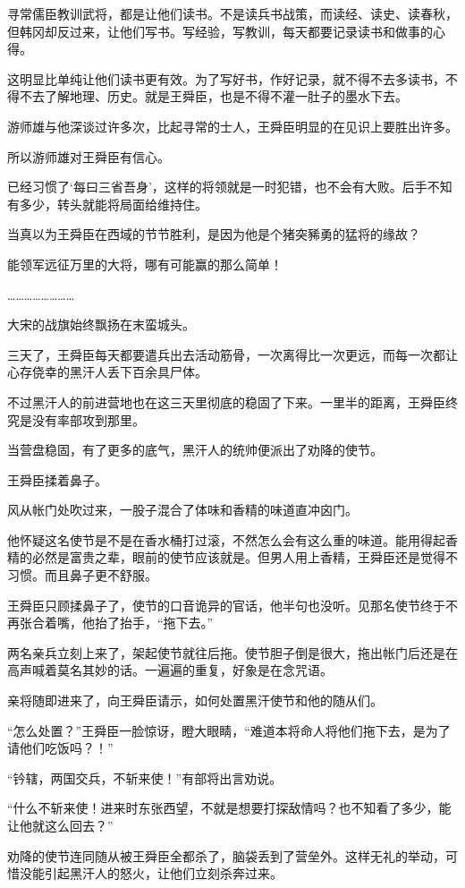 寻常儒臣教训武将，都是让他们读书。不是读兵书战策，而读经、读史、读春秋，但韩冈却反过来，让他们写书。写经验，写教训，每天都要记录读书和做事的心得。

这明显比单纯让他们读书更有效。为了写好书，作好记录，就不得不去多读书，不得不去了解地理、历史。就是王舜臣，也是不得不灌一肚子的墨水下去。

游师雄与他深谈过许多次，比起寻常的士人，王舜臣明显的在见识上要胜出许多。

所以游师雄对王舜臣有信心。

已经习惯了‘每曰三省吾身’，这样的将领就是一时犯错，也不会有大败。后手不知有多少，转头就能将局面给维持住。

当真以为王舜臣在西域的节节胜利，是因为他是个猪突豨勇的猛将的缘故？

能领军远征万里的大将，哪有可能赢的那么简单！

……………………

大宋的战旗始终飘扬在末蛮城头。

三天了，王舜臣每天都要遣兵出去活动筋骨，一次离得比一次更远，而每一次都让心存侥幸的黑汗人丢下百余具尸体。

不过黑汗人的前进营地也在这三天里彻底的稳固了下来。一里半的距离，王舜臣终究是没有率部攻到那里。

当营盘稳固，有了更多的底气，黑汗人的统帅便派出了劝降的使节。

王舜臣揉着鼻子。

风从帐门处吹过来，一股子混合了体味和香精的味道直冲囟门。

他怀疑这名使节是不是在香水桶打过滚，不然怎么会有这么重的味道。能用得起香精的必然是富贵之辈，眼前的使节应该就是。但男人用上香精，王舜臣还是觉得不习惯。而且鼻子更不舒服。

王舜臣只顾揉鼻子了，使节的口音诡异的官话，他半句也没听。见那名使节终于不再张合着嘴，他抬了抬手，“拖下去。”

两名亲兵立刻上来了，架起使节就往后拖。使节胆子倒是很大，拖出帐门后还是在高声喊着莫名其妙的话。一遍遍的重复，好象是在念咒语。

亲将随即进来了，向王舜臣请示，如何处置黑汗使节和他的随从们。

“怎么处置？”王舜臣一脸惊讶，瞪大眼睛，“难道本将命人将他们拖下去，是为了请他们吃饭吗？！”

“钤辖，两国交兵，不斩来使！”有部将出言劝说。

“什么不斩来使！进来时东张西望，不就是想要打探敌情吗？也不知看了多少，能让他就这么回去？”

劝降的使节连同随从被王舜臣全都杀了，脑袋丢到了营垒外。这样无礼的举动，可惜没能引起黑汗人的怒火，让他们立刻杀奔过来。

